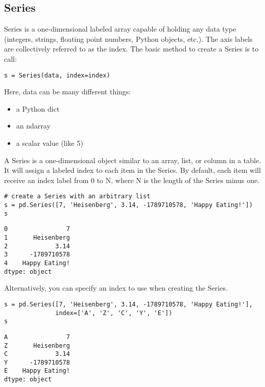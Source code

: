 \begin{itemize}
\begin{frame}
\subsection{Series}

Series is a one-dimensional labeled array capable of holding any data type (integers, strings, floating point numbers, Python objects, etc.). The axis labels are collectively referred to as the index. The basic method to create a Series is to call:
 
\begin{framed}
\begin{verbatim}
s = Series(data, index=index)
\end{verbatim}
\end{framed} 
Here, data can be many different things:
 
\begin{itemize}
\item a Python dict
\item an ndarray
\item a scalar value (like 5)
\end{itemize}

A Series is a one-dimensional object similar to an array, list, or column in a table. It will assign a labeled index to each item in the Series. By default, each item will receive an index label from 0 to N, where N is the length of the Series minus one.

\begin{framed}
\begin{verbatim}
# create a Series with an arbitrary list
s = pd.Series([7, 'Heisenberg', 3.14, -1789710578, 'Happy Eating!'])
s
\end{verbatim}
\end{framed}
\begin{verbatim}
0                7
1       Heisenberg
2             3.14
3      -1789710578
4    Happy Eating!
dtype: object
\end{verbatim}

Alternatively, you can specify an index to use when creating the Series.

\begin{framed}
\begin{verbatim}
s = pd.Series([7, 'Heisenberg', 3.14, -1789710578, 'Happy Eating!'],
              index=['A', 'Z', 'C', 'Y', 'E'])
s
\end{verbatim}
\end{framed}
\begin{verbatim}
A                7
Z       Heisenberg
C             3.14
Y      -1789710578
E    Happy Eating!
dtype: object
\end{verbatim}


\end{frame}
\end{itemize}
